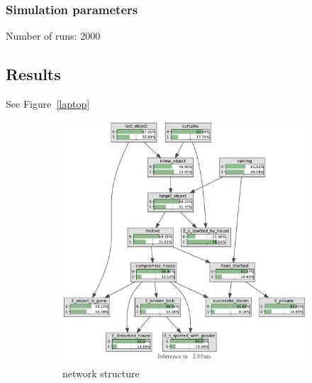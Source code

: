 \subsubsection{Simulation parameters}
Number of runs: 2000




\subsection{Results}

See Figure~\ref{laptop}


\begin{figure}[h]
\begin{center}
\begin{subfigure}{.7\textwidth}
\includegraphics[width=\linewidth]{../experiments/StolenLaptop/bnImage/BNIMAGEStolenLaptop.pdf}
\caption{network structure}
\label{laptopAcc}
\end{subfigure}
\end{center}

\begin{subfigure}{.5\textwidth}


\end{subfigure}
\end{figure}
